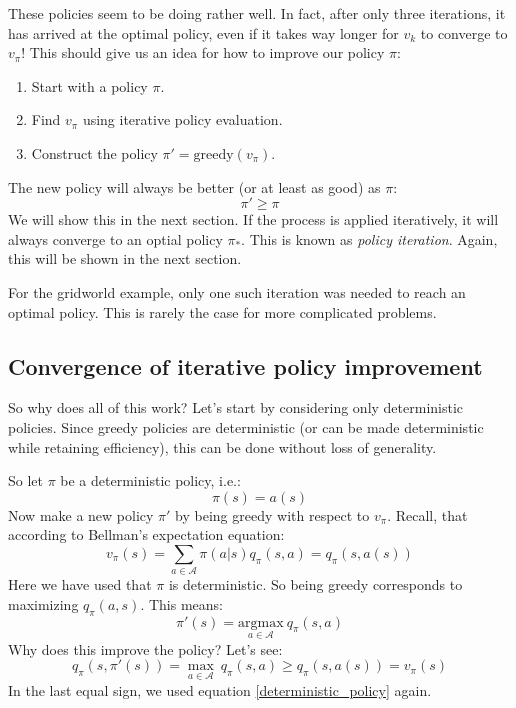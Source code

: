 \documentclass[12pt, a4paper]{article}
\numberwithin{equation}{section}
\begin{document}
These policies seem to be doing rather well. In fact, after only three iterations, it has arrived at the optimal policy, even if it takes way longer for $v_k$ to converge to $v_\pi$! This should give us an idea for how to improve our policy $\pi$:
\begin{enumerate}
\item Start with a policy $\pi$.
\item Find $v_\pi$ using iterative policy evaluation.
\item Construct the policy $\pi'=\textrm{greedy}(v_\pi)$.
\end{enumerate}
The new policy will always be better (or at least as good) as $\pi$:
\begin{equation}
\pi'\ge\pi
\end{equation}
We will show this in the next section. If the process is applied iteratively, it will always converge to an optial policy $\pi_*$. This is known as \textit{policy iteration}. Again, this will be shown in the next section.

For the gridworld example, only one such iteration was needed to reach an optimal policy. This is rarely the case for more complicated problems.

\subsection{Convergence of iterative policy improvement}
So why does all of this work? Let's start by considering only deterministic policies. Since greedy policies are deterministic (or can be made deterministic while retaining efficiency), this can be done without loss of generality.

So let $\pi$ be a deterministic policy, i.e.:
\begin{equation}
\pi(s)=a(s)
\end{equation}
Now make a new policy $\pi'$ by being greedy with respect to $v_\pi$. Recall, that according to Bellman's expectation equation:
\begin{equation}
v_\pi(s)=\sum_{a\in\mathcal{A}}\pi(a|s)q_\pi(s,a)=q_\pi(s,a(s))
\label{deterministic_policy}
\end{equation}
Here we have used that $\pi$ is deterministic. So being greedy corresponds to maximizing $q_\pi(a,s)$. This means:
\begin{equation}
\pi'(s)=\underset{a\in\mathcal{A}}{\textrm{argmax}}\ q_\pi(s,a)
\end{equation}
Why does this improve the policy? Let's see:
\begin{equation}
q_\pi(s,\pi'(s))=\underset{a\in\mathcal{A}}{\max}\ q_\pi(s,a)\ge q_\pi(s,a(s))=v_\pi(s)
\label{qv_inequality}
\end{equation}
In the last equal sign, we used equation \ref{deterministic_policy} again.
\end{document}
